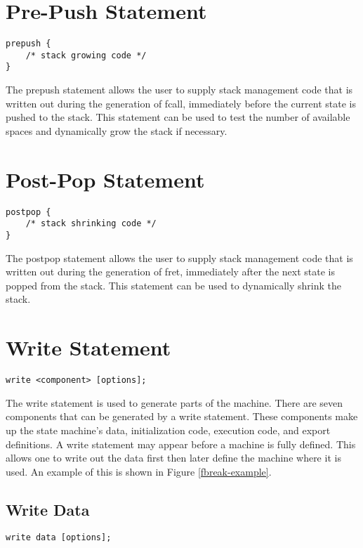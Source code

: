 \documentclass[letterpaper,11pt,oneside]{book}
\newcommand{\verbspace}{\vspace{10pt}}
\begin{document}
\section{Pre-Push Statement}
\label{prepush}

\begin{verbatim}
prepush { 
    /* stack growing code */
}
\end{verbatim}
\verbspace

The prepush statement allows the user to supply stack management code that is
written out during the generation of fcall, immediately before the current
state is pushed to the stack. This statement can be used to test the number of
available spaces and dynamically grow the stack if necessary.

\section{Post-Pop Statement}
\label{postpop}

\begin{verbatim}
postpop { 
    /* stack shrinking code */
}
\end{verbatim}
\verbspace

The postpop statement allows the user to supply stack management code that is
written out during the generation of fret, immediately after the next state is
popped from the stack. This statement can be used to dynamically shrink the
stack.

\section{Write Statement}
\label{write-statement}

\begin{verbatim}
write <component> [options];
\end{verbatim}
\verbspace

The write statement is used to generate parts of the machine. 
There are seven
components that can be generated by a write statement. These components make up the
state machine's data, initialization code, execution code, and export definitions.
A write statement may appear before a machine is fully defined.
This allows one to write out the data first then later define the machine where
it is used. An example of this is shown in Figure \ref{fbreak-example}.

\subsection{Write Data}
\begin{verbatim}
write data [options];
\end{verbatim}
\verbspace
\end{document}
